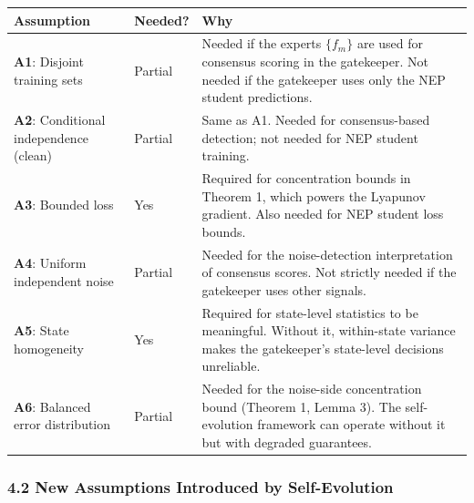 \documentclass[
  12pt,
]{article}
\begin{document}
\begin{longtable}[]{@{}
  >{\raggedright\arraybackslash}p{}
  >{\raggedright\arraybackslash}p{}
  >{\raggedright\arraybackslash}p{}@{}}
\toprule\noalign{}
\begin{minipage}[b]{\linewidth}\raggedright
Assumption
\end{minipage} & \begin{minipage}[b]{\linewidth}\raggedright
Needed?
\end{minipage} & \begin{minipage}[b]{\linewidth}\raggedright
Why
\end{minipage} \\
\midrule\noalign{}
\endhead
\bottomrule\noalign{}
\endlastfoot
\textbf{A1}: Disjoint training sets & Partial & Needed if the experts
\(\{f_m\}\) are used for consensus scoring in the gatekeeper. Not needed
if the gatekeeper uses only the NEP student predictions. \\
\textbf{A2}: Conditional independence (clean) & Partial & Same as A1.
Needed for consensus-based detection; not needed for NEP student
training. \\
\textbf{A3}: Bounded loss & Yes & Required for concentration bounds in
Theorem 1, which powers the Lyapunov gradient. Also needed for NEP
student loss bounds. \\
\textbf{A4}: Uniform independent noise & Partial & Needed for the
noise-detection interpretation of consensus scores. Not strictly needed
if the gatekeeper uses other signals. \\
\textbf{A5}: State homogeneity & Yes & Required for state-level
statistics to be meaningful. Without it, within-state variance makes the
gatekeeper's state-level decisions unreliable. \\
\textbf{A6}: Balanced error distribution & Partial & Needed for the
noise-side concentration bound (Theorem 1, Lemma 3). The self-evolution
framework can operate without it but with degraded guarantees. \\
\end{longtable}

\subsubsection{4.2 New Assumptions Introduced by
Self-Evolution}\label{new-assumptions-introduced-by-self-evolution}
\end{document}
